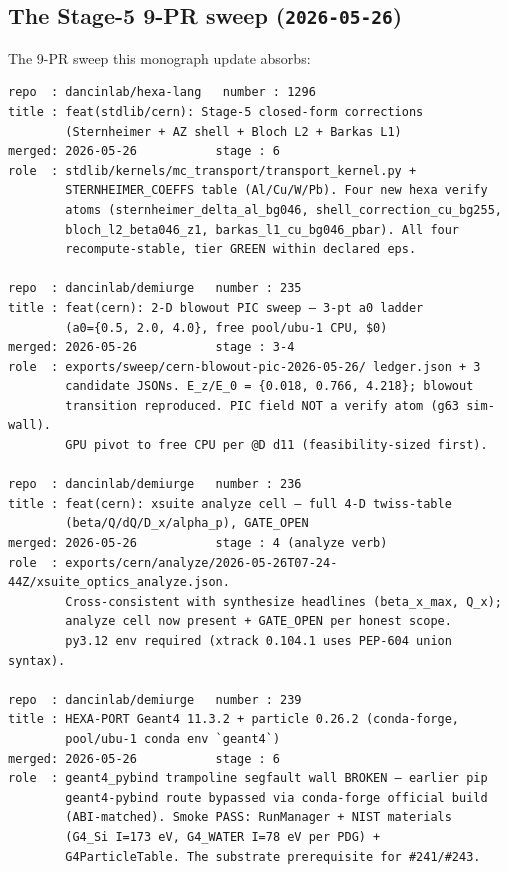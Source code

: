 \subsection{The Stage-5 9-PR sweep (\texttt{2026-05-26})}
\label{app:prroll-stage5}

The 9-PR sweep this monograph update absorbs:

\begin{lstlisting}
repo  : dancinlab/hexa-lang   number : 1296
title : feat(stdlib/cern): Stage-5 closed-form corrections
        (Sternheimer + AZ shell + Bloch L2 + Barkas L1)
merged: 2026-05-26           stage : 6
role  : stdlib/kernels/mc_transport/transport_kernel.py +
        STERNHEIMER_COEFFS table (Al/Cu/W/Pb). Four new hexa verify
        atoms (sternheimer_delta_al_bg046, shell_correction_cu_bg255,
        bloch_l2_beta046_z1, barkas_l1_cu_bg046_pbar). All four
        recompute-stable, tier GREEN within declared eps.

repo  : dancinlab/demiurge   number : 235
title : feat(cern): 2-D blowout PIC sweep — 3-pt a0 ladder
        (a0={0.5, 2.0, 4.0}, free pool/ubu-1 CPU, $0)
merged: 2026-05-26           stage : 3-4
role  : exports/sweep/cern-blowout-pic-2026-05-26/ ledger.json + 3
        candidate JSONs. E_z/E_0 = {0.018, 0.766, 4.218}; blowout
        transition reproduced. PIC field NOT a verify atom (g63 sim-wall).
        GPU pivot to free CPU per @D d11 (feasibility-sized first).

repo  : dancinlab/demiurge   number : 236
title : feat(cern): xsuite analyze cell — full 4-D twiss-table
        (beta/Q/dQ/D_x/alpha_p), GATE_OPEN
merged: 2026-05-26           stage : 4 (analyze verb)
role  : exports/cern/analyze/2026-05-26T07-24-44Z/xsuite_optics_analyze.json.
        Cross-consistent with synthesize headlines (beta_x_max, Q_x);
        analyze cell now present + GATE_OPEN per honest scope.
        py3.12 env required (xtrack 0.104.1 uses PEP-604 union syntax).

repo  : dancinlab/demiurge   number : 239
title : HEXA-PORT Geant4 11.3.2 + particle 0.26.2 (conda-forge,
        pool/ubu-1 conda env `geant4`)
merged: 2026-05-26           stage : 6
role  : geant4_pybind trampoline segfault wall BROKEN — earlier pip
        geant4-pybind route bypassed via conda-forge official build
        (ABI-matched). Smoke PASS: RunManager + NIST materials
        (G4_Si I=173 eV, G4_WATER I=78 eV per PDG) +
        G4ParticleTable. The substrate prerequisite for #241/#243.


\end{lstlisting}
